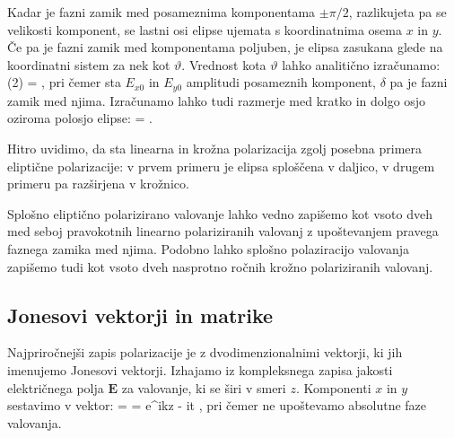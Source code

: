 Kadar je fazni zamik med posameznima komponentama $\pm \pi/2$, razlikujeta
pa se velikosti komponent, se lastni osi elipse ujemata s koordinatnima
osema $x$ in $y$. Če pa je fazni zamik med komponentama poljuben, je elipsa
zasukana glede na koordinatni sistem za nek kot $\vartheta$. Vrednost 
kota $\vartheta$ lahko analitično izračunamo:
\beq
\tan (2\vartheta) = ,
\label{eq:elipsatheta}
\eeq
pri čemer sta $E_{x0}$ in $E_{y0}$ amplitudi posameznih komponent, 
$\delta$ pa je fazni zamik med njima.  Izračunamo lahko tudi 
razmerje med kratko in dolgo osjo oziroma polosjo elipse:
\beq
{} = .
\label{eq:elipsaba}
\eeq
\begin{remark}
Hitro uvidimo, da sta linearna in krožna polarizacija zgolj posebna
primera eliptične polarizacije: v prvem primeru je elipsa sploščena v daljico, 
v drugem primeru pa razširjena v krožnico. 
\end{remark} 

Splošno eliptično polarizirano valovanje lahko vedno
zapišemo kot vsoto dveh med seboj pravokotnih
linearno polariziranih valovanj z upoštevanjem pravega faznega zamika med njima.
Podobno lahko splošno polaziracijo valovanja zapišemo tudi kot vsoto 
dveh nasprotno ročnih krožno polariziranih valovanj.

\subsection*{Jonesovi vektorji in matrike}
Najpriročnejši zapis polarizacije je z dvodimenzionalnimi 
vektorji, ki jih imenujemo Jonesovi vektorji.  Izhajamo iz kompleksnega zapisa
jakosti električnega polja $\mathbf{E}$ za valovanje, ki se širi v smeri $z$.
Komponenti $x$ in $y$ sestavimo v vektor:
\beq
{} = 
= e^{ikz - i\omega t} 
\!\!,
\label{eq:03_41}
\eeq
pri čemer ne upoštevamo absolutne faze valovanja.

